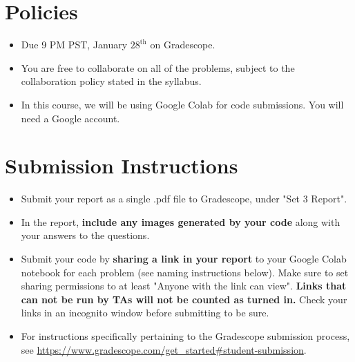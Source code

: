 \newif\ifshowsolutions
\showsolutionstrue






\DeclareMathOperator{\sign}{sign}


\pagestyle{fancy}




\section*{Policies}
\begin{itemize}
	\item Due 9 PM PST, January $28^\text{th}$ on Gradescope. 
	\item You are free to collaborate on all of the problems, subject to the collaboration policy stated in the syllabus.
	\item In this course, we will be using Google Colab for code submissions. You will need a Google account.
\end{itemize}

\section*{Submission Instructions}
\begin{itemize}
	\item Submit your report as a single .pdf file to Gradescope, under "Set 3 Report". 
	\item In the report, \textbf{include any images generated by your code} along with your answers to the questions.
	\item Submit your code by \textbf{sharing a link in your report} to your Google Colab notebook for each problem (see naming instructions below). Make sure to set sharing permissions to at least "Anyone with the link can view". \textbf{Links that can not be run by TAs will not be counted as turned in.} Check your links in an incognito window before submitting to be sure. 
	\item For instructions specifically pertaining to the Gradescope submission process, see \url{https://www.gradescope.com/get_started#student-submission}.
\end{itemize}

